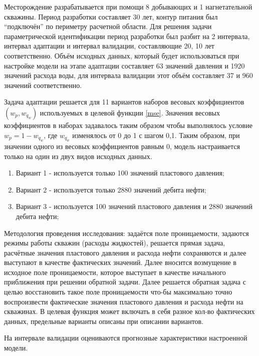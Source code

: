 \documentclass{article}
\begin{document}
Месторождение разрабатывается при помощи 8 добывающих и 1 нагнетательной скважины. Период разработки составляет 30 лет, контур питания был “подключён” по периметру расчетной области. Для решения задачи параметрической идентификации период разработки был разбит на 2 интервала, интервал адаптации и интервал валидации, составляющие 20, 10 лет соответственно. Объём исходных данных, который будет использоваться при настройке модели на этапе адаптации составляет 63 значений давления и 1920 значений расхода воды, для интервала валидации этот объём составляет 37 и 960 значений соответственно. 

Задача адаптации решается для 11 вариантов наборов весовых коэффициентов $(w_p, w_{q_w})$ используемых в целевой функции {\ref{mse}}. Значения весовых коэффициентов в наборах задавалось таким образом чтобы выполнялось условие $w_p = 1 - w_{q_w}$, где $w_{q_w}$ изменялось от 0 до 1 с шагом 0,1. Таким образом, при значении одного из весовых коэффициентов равным 0, модель настраивается только на один из двух видов исходных данных. 
\begin{enumerate}
	\item Вариант 1 - используется только 100 значений пластового давления;
	\item Вариант 2 - используется только 2880 значений дебита нефти;
	\item Вариант 3 - используется 100 значений пластового давления и 2880 значений дебита нефти;
\end{enumerate}
Методология проведения исследования: задаётся поле проницаемости, задаются режимы работы скважин (расходы жидкостей), решается прямая задача, расчётные значения пластового давления и расхода нефти сохраняются и далее выступают в качестве фактических значений. Далее вносится возмущение в исходное поле проницаемости, которое выступает в качестве начального приближения при решении обратной задачи. Далее решается обратная задача с целью восстановить такое поле проницаемости что-бы максимально точно воспроизвести фактические значения пластового давления и расхода нефти на скважинах. В целевая функция может включать в себя разное кол-во фактических данных, предельные варианты описаны при описании вариантов.

На интервале валидации оцениваются прогнозные характеристики настроенной модели. 
\end{document}
